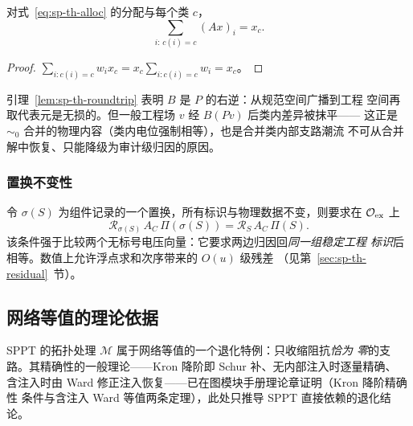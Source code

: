 \begin{lemma}[广延量分配守恒]\label{lem:sp-th-alloc-conserve}
对式~\eqref{eq:sp-th-alloc} 的分配与每个类 $c$，
\begin{equation}
\sum_{i:\,c(i)=c}(Ax)_i=x_c.
\end{equation}
\end{lemma}
\begin{proof}
$\sum_{i:c(i)=c}w_i x_c=x_c\sum_{i:c(i)=c}w_i=x_c$。
\end{proof}

\begin{remark}[往返恒等不等于真值恢复]
引理~\ref{lem:sp-th-roundtrip} 表明 $B$ 是 $P$ 的右逆：从规范空间广播到工程
空间再取代表元是无损的。但一般工程场 $v$ 经 $B(Pv)$ 后类内差异被抹平——
这正是 $\sim_0$ 合并的物理内容（类内电位强制相等），也是合并类内部支路潮流
不可从合并解中恢复、只能降级为审计级归因的原因。
\end{remark}

\subsubsection{置换不变性}
\begin{definition}[记录置换不变性]\label{def:sp-th-perm}
令 $\sigma(S)$ 为组件记录的一个置换，所有标识与物理数据不变，则要求在
$\mathcal O_{\rm ex}$ 上
\begin{equation}
\mathcal R_{\sigma(S)}\,A_C\,\Pi(\sigma(S))
=
\mathcal R_S\,A_C\,\Pi(S).
\label{eq:sp-th-perm}
\end{equation}
该条件强于比较两个无标号电压向量：它要求两边归因回\emph{同一组稳定工程
标识}后相等。数值上允许浮点求和次序带来的 $O(u)$ 级残差
（见第~\ref{sec:sp-th-residual}~节）。
\end{definition}

\subsection{网络等值的理论依据}\label{sec:sp-th-equiv}

SPPT 的拓扑处理 $\mathcal M$ 属于网络等值的一个退化特例：只收缩阻抗\emph{恰为
零}的支路。其精确性的一般理论——Kron 降阶即 Schur 补、无内部注入时逐量精确、
含注入时由 Ward 修正注入恢复——已在图模块手册理论章证明（Kron 降阶精确性
条件与含注入 Ward 等值两条定理），此处只推导 SPPT 直接依赖的退化结论。

